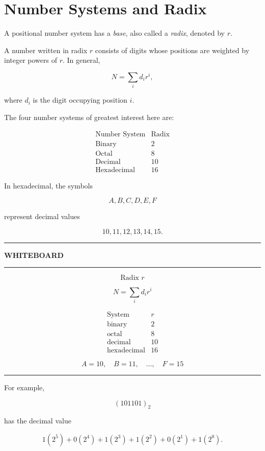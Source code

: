 \documentclass[11pt]{article}
\newenvironment{whiteboard}
{
    \par\medskip
    \begin{center}
    \begin{minipage}{0.94\textwidth}
    \hrule
    \vspace{0.4em}
    \textbf{\large WHITEBOARD}
    \vspace{0.3em}
    \hrule
    \vspace{0.7em}
}
{
    \vspace{0.5em}
    \hrule
    \end{minipage}
    \end{center}
    \medskip
}
\begin{document}
\section{Number Systems and Radix}

A positional number system has a \emph{base}, also called a \emph{radix},
denoted by \(r\).

A number written in radix \(r\) consists of digits whose positions are weighted
by integer powers of \(r\). In general,

\[
N=\sum_i d_i r^i,
\]

where \(d_i\) is the digit occupying position \(i\).

The four number systems of greatest interest here are:

\[
\begin{array}{c|c}
\text{Number System} & \text{Radix} \\ \hline
\text{Binary} & 2\\
\text{Octal} & 8\\
\text{Decimal} & 10\\
\text{Hexadecimal} & 16
\end{array}
\]

In hexadecimal, the symbols

\[
A,B,C,D,E,F
\]

represent decimal values

\[
10,11,12,13,14,15.
\]

\begin{whiteboard}
\[
\boxed{\text{Radix }r}
\]

\[
N=\sum_i d_i r^i
\]

\[
\begin{array}{c|c}
\text{System} & r \\ \hline
\text{binary} & 2\\
\text{octal} & 8\\
\text{decimal} & 10\\
\text{hexadecimal} & 16
\end{array}
\]

\[
A=10,\quad B=11,\quad \ldots,\quad F=15
\]
\end{whiteboard}

For example,

\[
(101101)_2
\]

has the decimal value

\[
1(2^5)+0(2^4)+1(2^3)+1(2^2)+0(2^1)+1(2^0).
\]
\end{document}
